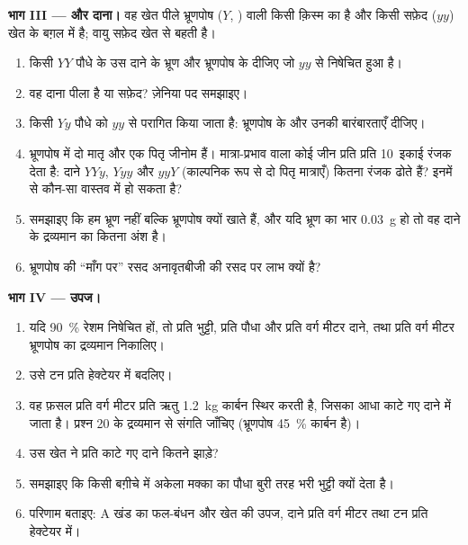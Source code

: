 \begin{problem}
\medskip
\noindent\textbf{भाग III ---  और दाना।}
वह खेत पीले भ्रूणपोष ($Y$, ) वाली किसी क़िस्म का है और किसी
सफ़ेद ($yy$) खेत के बग़ल में है; वायु सफ़ेद खेत से बहती है।
\begin{enumerate}[resume]
  \item किसी $YY$ पौधे के उस दाने के भ्रूण और भ्रूणपोष के 
        दीजिए जो $yy$  से निषेचित हुआ है।
  \item वह दाना पीला है या सफ़ेद? ज़ेनिया पद समझाइए।
  \item किसी $Yy$ पौधे को $yy$  से परागित किया जाता है: भ्रूणपोष
        के  और उनकी बारंबारताएँ दीजिए।
  \item भ्रूणपोष में दो मातृ और एक पितृ जीनोम हैं।
        मात्रा-प्रभाव वाला कोई जीन प्रति प्रति 10~इकाई रंजक देता है:
        दाने $YYy$, $Yyy$ और $yyY$ (काल्पनिक रूप से दो पितृ मात्राएँ)
        कितना रंजक ढोते हैं? इनमें से कौन-सा वास्तव में हो सकता है?
  \item समझाइए कि हम भ्रूण नहीं बल्कि भ्रूणपोष क्यों खाते हैं, और यदि
        भ्रूण का भार \qty{0.03}{g} हो तो वह दाने के द्रव्यमान का कितना
        अंश है।
  \item भ्रूणपोष की ``माँग पर'' रसद अनावृतबीजी की रसद पर लाभ
        क्यों है?
\end{enumerate}

\medskip
\noindent\textbf{भाग IV --- उपज।}
\begin{enumerate}[resume]
  \item यदि \qty{90}{\%} रेशम निषेचित हों, तो प्रति भुट्टी, प्रति
        पौधा और प्रति वर्ग मीटर दाने, तथा प्रति वर्ग मीटर भ्रूणपोष
        का द्रव्यमान निकालिए।
  \item उसे टन प्रति हेक्टेयर में बदलिए।
  \item वह फ़सल प्रति वर्ग मीटर प्रति ऋतु \qty{1.2}{kg} कार्बन स्थिर
        करती है, जिसका आधा काटे गए दाने में जाता है। प्रश्न 20 के
        द्रव्यमान से संगति जाँचिए (भ्रूणपोष \qty{45}{\%} कार्बन है)।
  \item उस खेत ने प्रति काटे गए दाने कितने  झाड़े?
  \item समझाइए कि किसी बग़ीचे में अकेला मक्का का पौधा बुरी तरह भरी
        भुट्टी क्यों देता है।
  \item परिणाम बताइए: A खंड का फल-बंधन और खेत की उपज,
        दाने प्रति वर्ग मीटर तथा टन प्रति हेक्टेयर में।
\end{enumerate}
\end{problem}
